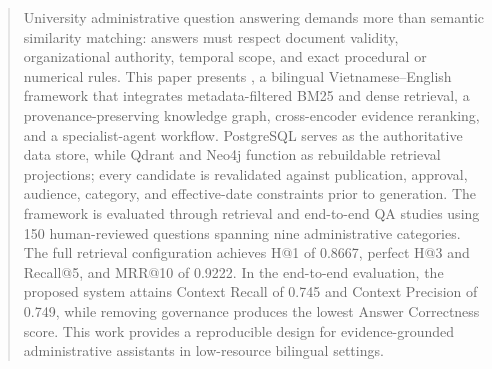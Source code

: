 \begin{abstract}
University administrative question answering demands more than
semantic similarity matching: answers must respect document validity,
organizational authority, temporal scope, and exact procedural or
numerical rules.
This paper presents {\system{}}, a bilingual Vietnamese--English
framework that integrates metadata-filtered \mbox{BM25} and dense retrieval,
a provenance-preserving knowledge graph, cross-encoder evidence
reranking, and a specialist-agent workflow.
PostgreSQL serves as the authoritative data store, while Qdrant and
Neo4j function as rebuildable retrieval projections; every candidate
is revalidated against publication, approval, audience, category, and
effective-date constraints prior to generation.
The framework is evaluated through retrieval and end-to-end QA studies
using 150 human-reviewed questions spanning nine administrative categories.
The full retrieval configuration achieves H@1 of 0.8667, perfect H@3 and
Recall@5, and MRR@10 of 0.9222. In the end-to-end evaluation, the proposed
system attains Context Recall of 0.745 and Context Precision of 0.749, while
removing governance produces the lowest Answer Correctness score.
This work provides a reproducible design for evidence-grounded
administrative assistants in low-resource bilingual settings.
\end{abstract}

